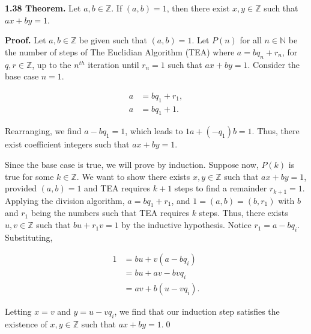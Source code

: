 \documentclass[12pt]{article}
\begin{document}
\noindent\textbf{1.38 Theorem.} Let $a,b\in\mathbb{Z}$. If $(a,b)=1$, then there exist $x,y\in\mathbb{Z}$ such that $ax+by=1$.

\bigskip

\noindent\textbf{Proof.} Let $a,b\in\mathbb{Z}$ be given such that $(a,b)=1$. Let $P(n)$ for all $n\in\mathbb{N}$ be the number of steps of The Euclidian Algorithm (TEA) where $a=bq_{n}+r_{n}$, for $q,r\in\mathbb{Z}$, up to the $n^{th}$ iteration until $r_{n}=1$ such that $ax+by=1$. Consider the base case $n=1$.

\begin{align*}
a &= bq_{1}+r_{1},\\
a &= bq_{1}+1.
\end{align*}

\noindent Rearranging, we find $a-bq_{1}=1$, which leads to $1a+(-q_{1})b=1$. Thus, there exist coefficient integers such that $ax+by=1$.

\bigskip

\noindent Since the base case is true, we will prove by induction. Suppose now, $P(k)$ is true for some $k\in\mathbb{Z}$. We want to show there exists $x,y\in\mathbb{Z}$ such that $ax+by=1$, provided $(a,b)=1$ and TEA requires $k+1$ steps to find a remainder $r_{k+1}=1$. Applying the division algorithm, $a=bq_{1}+r_{1}$, and $1=(a,b)=(b,r_{1})$ with $b$ and $r_{1}$ being the numbers such that TEA requires $k$ steps. Thus, there exists $u,v\in\mathbb{Z}$ such that $bu+r_{1}v=1$ by the inductive hypothesis. Notice $r_{1}=a-bq_{i}$. Substituting,

\begin{align*}
1 &= bu + v(a-bq_{i}) \\
&= bu + av - bvq_{i} \\
&= av + b(u-vq_{i}).
\end{align*}

\noindent Letting $x=v$ and $y=u-vq_{i}$, we find that our induction step satisfies the existence of $x,y\in\mathbb{Z}$ such that $ax+by=1$.\qed
\end{document}
